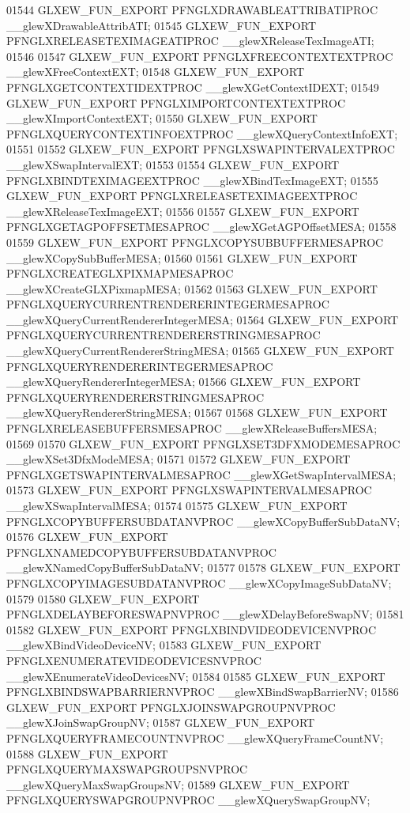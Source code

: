 \begin{DoxyCode}
01544 GLXEW_FUN_EXPORT PFNGLXDRAWABLEATTRIBATIPROC __glewXDrawableAttribATI;
01545 GLXEW_FUN_EXPORT PFNGLXRELEASETEXIMAGEATIPROC __glewXReleaseTexImageATI;
01546 
01547 GLXEW_FUN_EXPORT PFNGLXFREECONTEXTEXTPROC __glewXFreeContextEXT;
01548 GLXEW_FUN_EXPORT PFNGLXGETCONTEXTIDEXTPROC __glewXGetContextIDEXT;
01549 GLXEW_FUN_EXPORT PFNGLXIMPORTCONTEXTEXTPROC __glewXImportContextEXT;
01550 GLXEW_FUN_EXPORT PFNGLXQUERYCONTEXTINFOEXTPROC __glewXQueryContextInfoEXT;
01551 
01552 GLXEW_FUN_EXPORT PFNGLXSWAPINTERVALEXTPROC __glewXSwapIntervalEXT;
01553 
01554 GLXEW_FUN_EXPORT PFNGLXBINDTEXIMAGEEXTPROC __glewXBindTexImageEXT;
01555 GLXEW_FUN_EXPORT PFNGLXRELEASETEXIMAGEEXTPROC __glewXReleaseTexImageEXT;
01556 
01557 GLXEW_FUN_EXPORT PFNGLXGETAGPOFFSETMESAPROC __glewXGetAGPOffsetMESA;
01558 
01559 GLXEW_FUN_EXPORT PFNGLXCOPYSUBBUFFERMESAPROC __glewXCopySubBufferMESA;
01560 
01561 GLXEW_FUN_EXPORT PFNGLXCREATEGLXPIXMAPMESAPROC __glewXCreateGLXPixmapMESA;
01562 
01563 GLXEW_FUN_EXPORT PFNGLXQUERYCURRENTRENDERERINTEGERMESAPROC 
      __glewXQueryCurrentRendererIntegerMESA;
01564 GLXEW_FUN_EXPORT PFNGLXQUERYCURRENTRENDERERSTRINGMESAPROC 
      __glewXQueryCurrentRendererStringMESA;
01565 GLXEW_FUN_EXPORT PFNGLXQUERYRENDERERINTEGERMESAPROC 
      __glewXQueryRendererIntegerMESA;
01566 GLXEW_FUN_EXPORT PFNGLXQUERYRENDERERSTRINGMESAPROC 
      __glewXQueryRendererStringMESA;
01567 
01568 GLXEW_FUN_EXPORT PFNGLXRELEASEBUFFERSMESAPROC __glewXReleaseBuffersMESA;
01569 
01570 GLXEW_FUN_EXPORT PFNGLXSET3DFXMODEMESAPROC __glewXSet3DfxModeMESA;
01571 
01572 GLXEW_FUN_EXPORT PFNGLXGETSWAPINTERVALMESAPROC __glewXGetSwapIntervalMESA;
01573 GLXEW_FUN_EXPORT PFNGLXSWAPINTERVALMESAPROC __glewXSwapIntervalMESA;
01574 
01575 GLXEW_FUN_EXPORT PFNGLXCOPYBUFFERSUBDATANVPROC __glewXCopyBufferSubDataNV;
01576 GLXEW_FUN_EXPORT PFNGLXNAMEDCOPYBUFFERSUBDATANVPROC 
      __glewXNamedCopyBufferSubDataNV;
01577 
01578 GLXEW_FUN_EXPORT PFNGLXCOPYIMAGESUBDATANVPROC __glewXCopyImageSubDataNV;
01579 
01580 GLXEW_FUN_EXPORT PFNGLXDELAYBEFORESWAPNVPROC __glewXDelayBeforeSwapNV;
01581 
01582 GLXEW_FUN_EXPORT PFNGLXBINDVIDEODEVICENVPROC __glewXBindVideoDeviceNV;
01583 GLXEW_FUN_EXPORT PFNGLXENUMERATEVIDEODEVICESNVPROC 
      __glewXEnumerateVideoDevicesNV;
01584 
01585 GLXEW_FUN_EXPORT PFNGLXBINDSWAPBARRIERNVPROC __glewXBindSwapBarrierNV;
01586 GLXEW_FUN_EXPORT PFNGLXJOINSWAPGROUPNVPROC __glewXJoinSwapGroupNV;
01587 GLXEW_FUN_EXPORT PFNGLXQUERYFRAMECOUNTNVPROC __glewXQueryFrameCountNV;
01588 GLXEW_FUN_EXPORT PFNGLXQUERYMAXSWAPGROUPSNVPROC __glewXQueryMaxSwapGroupsNV;
01589 GLXEW_FUN_EXPORT PFNGLXQUERYSWAPGROUPNVPROC __glewXQuerySwapGroupNV;

\end{DoxyCode}
